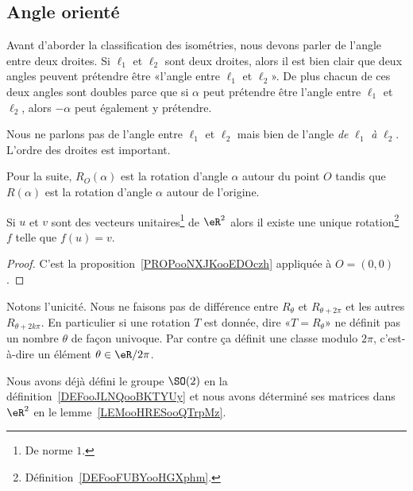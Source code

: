 \subsection{Angle orienté}

Avant d'aborder la classification des isométries, nous devons parler de l'angle entre deux droites. Si \( \ell_1\) et \( \ell_2\) sont deux droites, alors il est bien clair que deux angles peuvent prétendre être «l'angle entre \( \ell_1\) et \( \ell_2\)». De plus chacun de ces deux angles sont doubles parce que si \( \alpha\) peut prétendre être l'angle entre \( \ell_1\) et \( \ell_2\), alors \( -\alpha\) peut également y prétendre.

\begin{remark}
	Nous ne parlons pas de l'angle entre \( \ell_1\) et \( \ell_2\) mais bien de l'angle \emph{de} \( \ell_1\) \emph{à} \( \ell_2\). L'ordre des droites est important.
\end{remark}

\begin{normaltext}
	Pour la suite, \( R_O(\alpha)\) est la rotation d'angle \( \alpha\) autour du point \( O\) tandis que \( R(\alpha)\) est la rotation d'angle \( \alpha\) autour de l'origine.
\end{normaltext}

\begin{proposition}      \label{PROPooDWIMooQPkobw}
	Si \( u\) et \( v\) sont des vecteurs unitaires\footnote{De norme \( 1\).} de \( \eR^2\) alors il existe une unique rotation\footnote{Définition~\ref{DEFooFUBYooHGXphm}.} \( f\) telle que \( f(u)=v\).
\end{proposition}

\begin{proof}
	C'est la proposition~\ref{PROPooNXJKooEDOczh} appliquée à \( O=(0,0)\).
\end{proof}

\begin{remark}
	Notons l'unicité. Nous ne faisons pas de différence entre \( R_{\theta}\) et \( R_{\theta+2\pi}\) et les autres \( R_{\theta+2k\pi}\). En particulier si une rotation \( T\) est donnée, dire «\( T=R_{\theta}\)» ne définit pas un nombre \( \theta\) de façon univoque. Par contre ça définit une classe modulo \( 2\pi\), c'est-à-dire un élément \( \theta\in \eR/2\pi\).

	Nous avons déjà défini le groupe \( \SO(2)\) en la définition~\ref{DEFooJLNQooBKTYUy} et nous avons déterminé ses matrices dans \( \eR^2\) en le lemme~\ref{LEMooHRESooQTrpMz}.
\end{remark}


